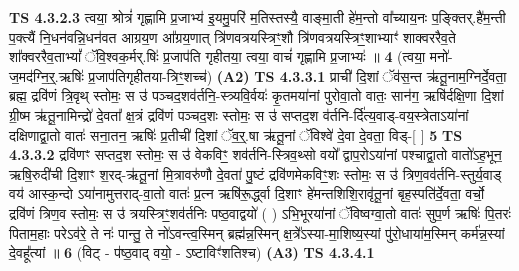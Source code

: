 \documentclass[17pt]{extarticle}
\begin{document}
                  \newline
                                \textbf{ TS 4.3.2.3} \newline
                  त्वया॒ श्रोत्रं॑ गृह्णामि प्र॒जाभ्य॑ इ॒यमु॒परि॑ म॒तिस्तस्यै॒ वाङ्मा॒ती हे॑म॒न्तो वा᳚च्याय॒नः प॒ङ्क्तिर्.है॑म॒न्ती प॒क्त्यैं नि॒धन॑वन्नि॒धन॑वत आग्रय॒ण आ᳚ग्रय॒णात् त्रि॑णवत्रयस्त्रिꣳ॒॒शौ त्रि॑णवत्रयस्त्रिꣳ॒॒शाभ्याꣳ॑ शाक्वररैव॒ते शा᳚क्वररैव॒ताभ्यां᳚ ॅवि॒श्वक॒र्मर्.षिः॑ प्र॒जाप॑ति गृहीतया॒ त्वया॒ वाचं॑ गृह्णामि प्र॒जाभ्यः॑ ॥ \textbf{  4 } \newline
                  \newline
                      (त्वया॒ मनो॑-ज॒मद॑ग्नि॒र्॒.ऋषिः॑ प्र॒जाप॑तिगृहीतया-त्रिꣳ॒॒शच्च॑)  \textbf{(A2)} \newline \newline
                                        \textbf{ TS 4.3.3.1} \newline
                  प्राची॑ दि॒शां ॅव॑स॒न्त ऋ॑तू॒नाम॒ग्निर्दे॒वता॒ ब्रह्म॒ द्रवि॑णं त्रि॒वृथ् स्तोमः॒ स उ॑ पञ्चद॒शव॑र्तनि॒-स्त्र्यवि॒र्वयः॑ कृ॒तमया॑नां पुरोवा॒तो वातः॒ सान॑ग॒ ऋषि॑र्दक्षि॒णा दि॒शां ग्री॒ष्म ऋ॑तू॒नामिन्द्रो॑ दे॒वता᳚ क्ष॒त्रं द्रवि॑णं पञ्चद॒शः स्तोमः॒ स उ॑ सप्तद॒श व॑र्तनि-र्दि॑त्य॒वाड्-वय॒स्त्रेताऽया॑नां दक्षिणाद्वा॒तो वातः॑ सना॒तन॒ ऋषिः॑ प्र॒तीची॑ दि॒शां ॅव॒र्॒.षा ऋ॑तू॒नां ॅविश्वे॑ दे॒वा दे॒वता॒ विड्-[  ] \textbf{  5} \newline
                  \newline
                                \textbf{ TS 4.3.3.2} \newline
                  द्रवि॑णꣳ सप्तद॒श स्तोमः॒ स उ॑ वेकविꣳ॒॒ शव॑र्तनि-स्त्रिव॒थ्सो वयो᳚ द्वाप॒रोऽया॑नां पश्चाद्वा॒तो वातो॑ऽह॒भून॒ ऋषि॒रुदी॑ची दि॒शाꣳ श॒रद्-ऋ॑तू॒नां मि॒त्रावरु॑णौ दे॒वता॑ पु॒ष्टं द्रवि॑णमेकविꣳ॒॒शः स्तोमः॒ स उ॑ त्रिण॒वव॑र्तनि-स्तुर्य॒वाड् वय॑ आस्क॒न्दो ऽया॑नामुत्तराद्-वा॒तो वातः॑ प्र॒त्न ऋषि॑रू॒र्द्ध्वा दि॒शाꣳ हे॑मन्तशिशि॒रावृ॑तू॒नां बृह॒स्पति॑र्दे॒वता॒ वर्चो॒ द्रवि॑णं त्रिण॒व स्तोमः॒ स उ॑ त्रयस्त्रिꣳ॒॒शव॑र्तनिः पष्ठ॒वाद्वयो॑ ( ) ऽभि॒भूरया॑नां ॅविष्वग्वा॒तो वातः॑ सुप॒र्ण ऋषिः॑ पि॒तरः॑ पिताम॒हाः परेऽव॑रे॒ ते नः॑ पान्तु॒ ते नो॑ऽवन्त्व॒स्मिन् ब्रह्म॑न्न॒स्मिन् क्ष॒त्रे᳚ऽस्या-मा॒शिष्य॒स्यां पु॑रो॒धाया॑म॒स्मिन् कर्म॑न्न॒स्यां दे॒वहू᳚त्यां ॥ \textbf{  6} \newline
                  \newline
                      (विट् - प॑ष्ठ॒वाद् वयो॒ - ऽष्टाविꣳ॑शतिश्च)  \textbf{(A3)} \newline \newline
                                        \textbf{ TS 4.3.4.1} \newline
\end{document}
